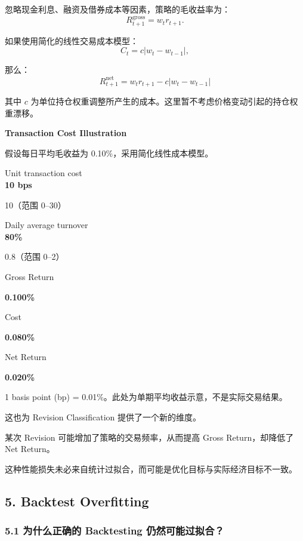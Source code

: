 忽略现金利息、融资及借券成本等因素，策略的毛收益率为：
\[R_{t+1}^{\mathrm{gross}}
=
w_t r_{t+1}.\]

如果使用简化的线性交易成本模型：
\[C_t=c|w_t-w_{t-1}|,\]

那么：
\[\boxed{
R_{t+1}^{\mathrm{net}}
=
w_t r_{t+1}
-
c|w_t-w_{t-1}|
}\]

其中 \(c\) 为单位持仓权重调整所产生的成本。这里暂不考虑价格变动引起的持仓权重漂移。

\textbf{Transaction Cost Illustration}

假设每日平均毛收益为 0.10\%，采用简化线性成本模型。

Unit transaction cost\\
\textbf{10 bps}

10（范围 0--30）

Daily average turnover\\
\textbf{80\%}

0.8（范围 0--2）

Gross Return

\textbf{0.100\%}

Cost

\textbf{0.080\%}

Net Return

\textbf{0.020\%}

1 basis point (bp) = 0.01\%。此处为单期平均收益示意，不是实际交易结果。

这也为 Revision Classification 提供了一个新的维度。

某次 Revision 可能增加了策略的交易频率，从而提高 Gross Return，却降低了 Net Return。

这种性能损失未必来自统计过拟合，而可能是优化目标与实际经济目标不一致。

\hypertarget{part-2-27-0001-backtest-overfitting}{%
\subsection{5. Backtest Overfitting}\label{part-2-27-0001-backtest-overfitting}}

\hypertarget{part-2-27-0001-ux4e3aux4ec0ux4e48ux6b63ux786eux7684-backtesting-ux4ecdux7136ux53efux80fdux8fc7ux62dfux5408}{%
\subsubsection{5.1 为什么正确的 Backtesting 仍然可能过拟合？}\label{part-2-27-0001-ux4e3aux4ec0ux4e48ux6b63ux786eux7684-backtesting-ux4ecdux7136ux53efux80fdux8fc7ux62dfux5408}}

